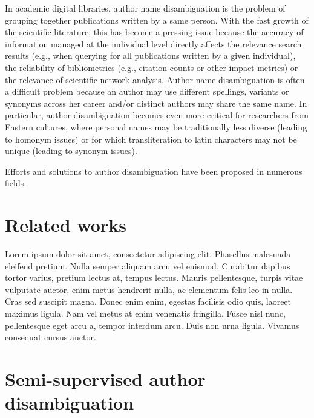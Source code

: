 \documentclass{article}
\begin{document}
In academic digital libraries, author name disambiguation is the problem of
grouping together publications written by a same person.  With the fast growth
of the scientific literature, this has become a pressing issue because the
accuracy of information managed at the individual level directly affects the
relevance search results (e.g., when querying for all publications written by a
given individual), the reliability of bibliometrics (e.g., citation counts or
other impact metrics) or the relevance of scientific network analysis. Author
name disambiguation is often a difficult problem because an author may use
different spellings, variants or synonyms across her career and/or distinct
authors may share the same name. In particular, author disambiguation becomes
even more critical for researchers from Eastern cultures, where personal names
may be traditionally less diverse (leading to homonym issues) or for which
transliteration to latin characters may not be unique (leading to synonym
issues).

Efforts and solutions to author disambiguation have been proposed in numerous
fields.









\section{Related works}
\label{relate-works}

Lorem ipsum dolor sit amet, consectetur adipiscing elit. Phasellus malesuada
eleifend pretium. Nulla semper aliquam arcu vel euismod. Curabitur dapibus
tortor varius, pretium lectus at, tempus lectus. Mauris pellentesque, turpis
vitae vulputate auctor, enim metus hendrerit nulla, ac elementum felis leo in
nulla. Cras sed suscipit magna. Donec enim enim, egestas facilisis odio quis,
laoreet maximus ligula. Nam vel metus at enim venenatis fringilla. Fusce nisl
nunc, pellentesque eget arcu a, tempor interdum arcu. Duis non urna ligula.
Vivamus consequat cursus auctor.



\section{Semi-supervised author disambiguation}
\label{methods}
\end{document}
